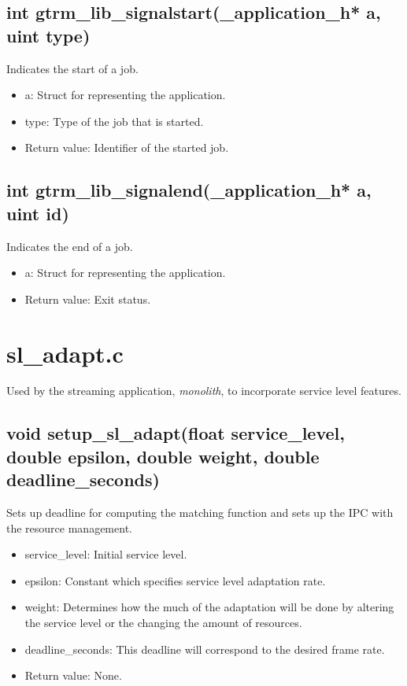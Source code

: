 \documentclass[nobiblatex]{LTHthesis}
\begin{document}
\subsection{int gtrm\_lib\_signalstart(\_application\_h* a, uint type)}
Indicates the start of a job.
\begin{itemize}
\item a: Struct for representing the application.
\item type: Type of the job that is started.
\item Return value: Identifier of the started job.
\end{itemize}

\subsection{int gtrm\_lib\_signalend(\_application\_h* a, uint id)}
Indicates the end of a job.
\begin{itemize}
\item a: Struct for representing the application.
\item Return value: Exit status.
\end{itemize}

\section{sl\_adapt.c}
Used by the streaming application, \emph{monolith}, to incorporate service level features.
\subsection{void setup\_sl\_adapt(float service\_level, double epsilon, double weight, double deadline\_seconds)}
Sets up deadline for computing the matching function and sets up the IPC with the resource management.
\begin{itemize}
\item service\_level: Initial service level.
\item epsilon: Constant which specifies service level adaptation rate.
\item weight: Determines how the much of the adaptation will be done by altering the service level or the changing the amount of resources.
\item deadline\_seconds: This deadline will correspond to the desired frame rate.
\item Return value: None.
\end{itemize}
\end{document}
